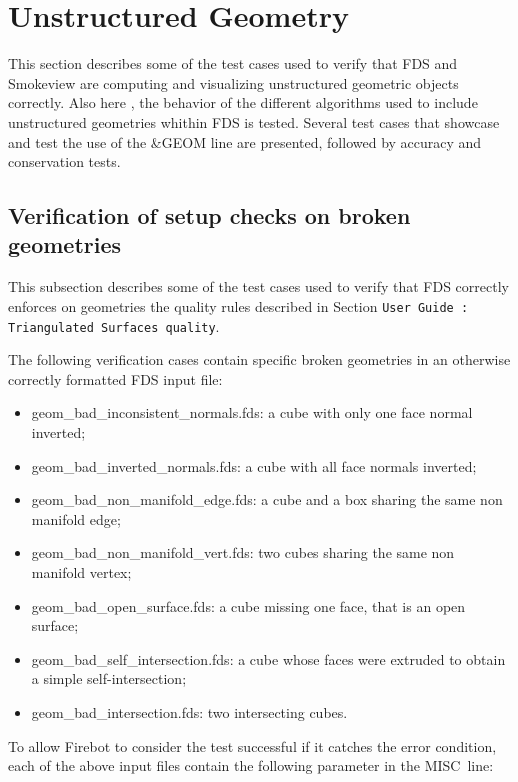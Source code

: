 \documentclass[11pt]{book}
\begin{document}
\ifcompgeom

\chapter{Unstructured Geometry}

This section describes some of the test cases used to verify that FDS and Smokeview are computing
and visualizing unstructured geometric objects correctly. Also here , the behavior of the different
algorithms used to include unstructured geometries whithin FDS is tested. Several test cases that showcase
and test the use of the \&GEOM line are presented, followed by accuracy and conservation tests.


\section{Verification of setup checks on broken geometries}

This subsection describes some of the test cases used to verify that FDS correctly enforces on geometries
the quality rules described in Section \texttt{User Guide : Triangulated Surfaces quality}.

The following verification cases contain specific broken geometries in an otherwise correctly
formatted FDS input file:

\begin{itemize}
  \item {\ct geom\_bad\_inconsistent\_normals.fds}: a cube with only one face normal inverted;
  \item {\ct geom\_bad\_inverted\_normals.fds}: a cube with all face normals inverted;
  \item {\ct geom\_bad\_non\_manifold\_edge.fds}: a cube and a box sharing the same non manifold edge;
  \item {\ct geom\_bad\_non\_manifold\_vert.fds}: two cubes sharing the same non manifold vertex; %
  \item {\ct geom\_bad\_open\_surface.fds}: a cube missing one face, that is an open surface;
  \item {\ct geom\_bad\_self\_intersection.fds}: a cube whose faces were extruded to obtain a simple self-intersection;
  \item {\ct geom\_bad\_intersection.fds}: two intersecting cubes. %
\end{itemize}

To allow Firebot to consider the test successful if it catches the error condition,
each of the above input files contain the following parameter in the {\ct MISC}\ line:
\end{document}
